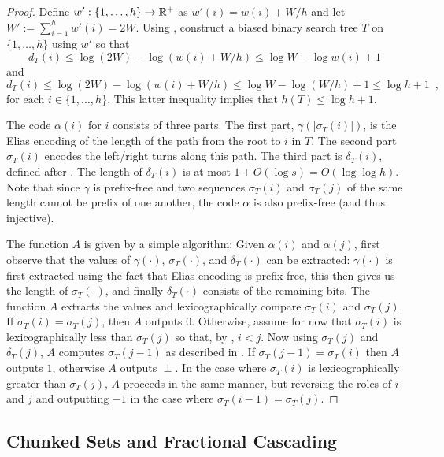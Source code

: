 \documentclass[kpfonts]{patmorin}
\let\le\leqslant
\begin{document}
\begin{proof}
  Define $w':\{1,\ldots,h\}\to \mathbb{R}^+$ as $w'(i)=w(i)+W/h$ and let $W':=\sum_{i=1}^h w'(i)=2W$.
  Using , construct a biased binary search tree $T$ on $\{1,\ldots,h\}$ using $w'$ so that 
  \[   
    d_T(i)\le\log (2W)-\log(w(i)+W/h) \le \log W-\log w(i)+1
  \]
  and
  \[
  d_T(i)\le\log (2W)-\log(w(i)+W/h) \le \log W-\log (W/h)+1 \le \log h + 1\enspace ,
  \]
  for each $i\in\{1,\ldots,h\}$.  This latter inequality implies that $h(T)\le\log h + 1$.

  The code $\alpha(i)$ for $i$ consists of three parts.  The first part, $\gamma(|\sigma_T(i)|)$, is the Elias encoding of the length of the path from the root to $i$ in $T$. The second part $\sigma_T(i)$ encodes the left/right turns along this path. The third part is $\delta_T(i)$, defined after . The length of $\delta_T(i)$ is at most $1+O(\log s)=O(\log\log h)$. Note that since $\gamma$ is prefix-free and two sequences $\sigma_T(i)$ and $\sigma_T(j)$ of the same length cannot be prefix of one another, the code $\alpha$ is also prefix-free (and thus injective).

  The function $A$ is given by a simple algorithm: Given $\alpha(i)$ and $\alpha(j)$, first observe that the values of $\gamma(\cdot)$, $\sigma_T(\cdot)$, and $\delta_T(\cdot)$ can be extracted: $\gamma(\cdot)$ is first extracted using the fact that Elias encoding is prefix-free, this then gives us the length of $\sigma_T(\cdot)$, and finally $\delta_T(\cdot)$ consists of the remaining bits. 
   The function $A$ extracts the values and lexicographically compare $\sigma_T(i)$ and $\sigma_T(j)$.  If $\sigma_T(i)=\sigma_T(j)$, then $A$ outputs $0$. 
   Otherwise, assume for now that $\sigma_T(i)$ is lexicographically less than $\sigma_T(j)$ so that, by , $i < j$.  Now using $\sigma_T(j)$ and $\delta_T(j)$, $A$ computes $\sigma_T(j-1)$ as described in .  
   If $\sigma_T(j-1)=\sigma_T(i)$ then $A$ outputs $1$, otherwise $A$ outputs $\perp$.
  In the case where $\sigma_T(i)$ is lexicographically greater than $\sigma_T(j)$, $A$ proceeds in the same manner, but reversing the roles of $i$ and $j$ and outputting $-1$ in the case where $\sigma_T(i-1)=\sigma_T(j)$.
\end{proof}

\subsection{Chunked Sets and Fractional Cascading}
\end{document}
